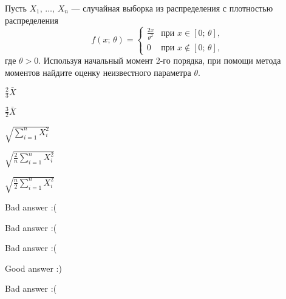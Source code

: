 
\begin{question}
Пусть \(X_1, \, \ldots, \, X_n\) --- случайная выборка из распределения
с плотностью распределения \[
    f(x; \, \theta) = \begin{cases}
                          \frac{2x}{\theta^2} & \text{при } x \in [0;\,\theta], \\
                          0 & \text{при } x \not\in [0;\,\theta],
                      \end{cases}
\] где \(\theta > 0\). Используя начальный момент 2-го порядка, при
помощи метода моментов найдите оценку неизвестного параметра \(\theta\).
\begin{answerlist}
  \item \(\tfrac{2}{3}\bar{X}\)
  \item \(\tfrac{3}{2}\bar{X}\)
  \item \(\sqrt{\sum_{i=1}^{n}X_i^2}\)
  \item \(\sqrt{\tfrac{2}{n}\sum_{i=1}^{n}X_i^2}\)
  \item \(\sqrt{\tfrac{n}{2}\sum_{i=1}^{n}X_i^2}\)
\end{answerlist}
\end{question}

\begin{solution}
\begin{answerlist}
  \item Bad answer :(
  \item Bad answer :(
  \item Bad answer :(
  \item Good answer :)
  \item Bad answer :(
\end{answerlist}
\end{solution}


